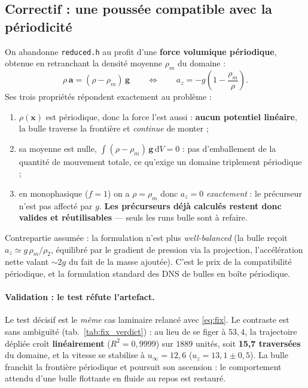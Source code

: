 \subsection{Correctif : une poussée compatible avec la périodicité}

On abandonne \texttt{reduced.h} au profit d'une \textbf{force volumique
périodique}, obtenue en retranchant la densité moyenne $\rho_m$ du domaine :
\begin{equation}
    \rho\,\mathbf{a} = (\rho - \rho_m)\,\mathbf{g}
    \qquad\Longleftrightarrow\qquad
    a_z = -g\left(1 - \frac{\rho_m}{\rho}\right).
    \label{eq:fix}
\end{equation}
Ses trois propriétés répondent exactement au problème :
\begin{enumerate}
    \item $\rho(\mathbf{x})$ est périodique, donc la force l'est aussi : \textbf{aucun
    potentiel linéaire}, la bulle traverse la frontière et \emph{continue} de monter ;
    \item sa moyenne est nulle, $\int(\rho-\rho_m)\,\mathbf{g}\,\mathrm{d}V = 0$ :
    pas d'emballement de la quantité de mouvement totale, ce qu'exige un domaine
    triplement périodique ;
    \item en monophasique ($f=1$) on a $\rho=\rho_m$ donc $a_z=0$ \emph{exactement} :
    le précurseur n'est pas affecté par $g$. \textbf{Les précurseurs déjà calculés
    restent donc valides et réutilisables} --- seuls les runs bulle sont à refaire.
\end{enumerate}
Contrepartie assumée : la formulation n'est plus \emph{well-balanced} (la bulle
reçoit $a_z\simeq g\,\rho_m/\rho_2$, équilibré par le gradient de pression via la
projection, l'accélération nette valant ${\sim}2g$ du fait de la masse ajoutée).
C'est le prix de la compatibilité périodique, et la formulation standard des DNS
de bulles en boîte périodique.

\paragraph{Validation : le test réfute l'artefact.} Le test décisif est le
\emph{même} cas laminaire relancé avec \eqref{eq:fix}. Le contraste est sans
ambiguïté (tab.~\ref{tab:fix_verdict}) : au lieu de se figer à $53{,}4$, la
trajectoire dépliée croît \textbf{linéairement} ($R^2 = 0{,}9999$) sur
$1889$ unités, soit \textbf{15,7 traversées} du domaine, et la vitesse se stabilise
à $u_\infty = 12{,}6$ ($u_z = 13{,}1 \pm 0{,}5$). La bulle franchit la frontière
périodique et poursuit son ascension : le comportement attendu d'une bulle
flottante en fluide au repos est restauré.

